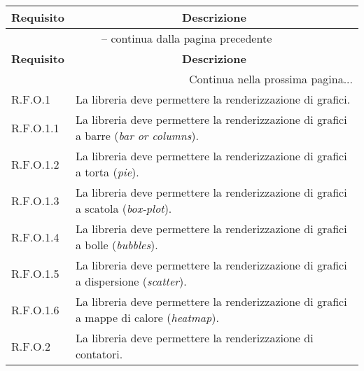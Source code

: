 \begin{center}
    \begin{longtable}{|p{2.5cm}|p{10cm}|}
        \hline
        \rowcolor{gray!30}
        \textbf{Requisito} & \multicolumn{1}{c|}{\textbf{Descrizione}}                                                                    \\
        \hline
        \endfirsthead
        \hline
        \multicolumn{2}{|c|}{{\tablename\ \thetable{} -- continua dalla pagina precedente}}                                               \\
        \hline
        \rowcolor{gray!30}
        \textbf{Requisito} & \multicolumn{1}{c|}{\textbf{Descrizione}}                                                                    \\
        \endhead
        \hline
        \multicolumn{2}{|r|}{{Continua nella prossima pagina...}}                                                                         \\
        \hline
        \endfoot
        \hline
        \endlastfoot
        R.F.O.1            & La libreria deve permettere la renderizzazione di grafici.                                                   \\
        \hline
        R.F.O.1.1          & La libreria deve permettere la renderizzazione di grafici a barre (\textit{bar or columns}).                 \\
        \hline
        R.F.O.1.2          & La libreria deve permettere la renderizzazione di grafici a torta (\textit{pie}).                            \\
        \hline
        R.F.O.1.3          & La libreria deve permettere la renderizzazione di grafici a scatola (\textit{box-plot}).                     \\
        \hline
        R.F.O.1.4          & La libreria deve permettere la renderizzazione di grafici a bolle (\textit{bubbles}).                        \\
        \hline
        R.F.O.1.5          & La libreria deve permettere la renderizzazione di grafici a dispersione (\textit{scatter}).                  \\
        \hline
        R.F.O.1.6          & La libreria deve permettere la renderizzazione di grafici a mappe di calore (\textit{heatmap}).              \\
        \hline
        R.F.O.2            & La libreria deve permettere la renderizzazione di contatori.                                                 \\

\end{longtable}
\end{center}

